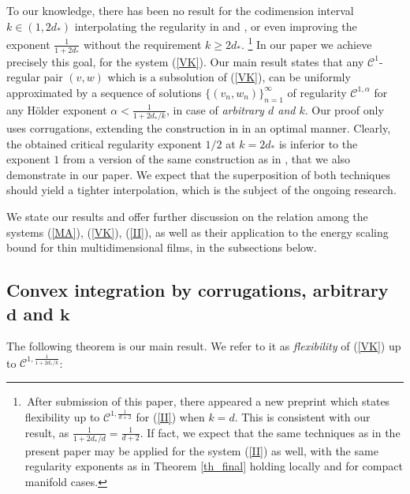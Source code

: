 \documentclass[reqno,twoside,11pt]{amsart}
\numberwithin{equation}{section}
\theoremstyle{plain}
\theoremstyle{definition}
\begin{document}
\noindent To our knowledge, there has been no result
for the codimension interval $k\in (1, 2d_*)$
interpolating the regularity in \cite{CDS} and \cite{Kallen}, 
or even improving the exponent $\frac{1}{1+2d_*}$ without the requirement $k\geq 2d_*$.
\footnote{ $\,$After submission of this paper, there appeared a new preprint \cite{CS_new} which
states flexibility up to $\mathcal{C}^{1,\frac{1}{d+2}}$ 
for (\ref{II}) when $k=d$. This is consistent with our
result, as $\frac{1}{1+2d_*/d} = \frac{1}{d+2}$. If fact, we
expect that the same techniques as in the present paper may be
applied for the system (\ref{II}) as well, with the same regularity
exponents as in Theorem \ref{th_final} holding locally and for compact
manifold cases.}
In our paper we achieve precisely this goal, for the
system (\ref{VK}). Our main result states that any $\mathcal{C}^1$-regular pair $(v,w)$ 
which is a subsolution of (\ref{VK}), can be uniformly approximated
by a sequence of solutions $\{(v_n,w_n)\}_{n=1}^\infty$ of regularity
$\mathcal{C}^{1,\alpha}$ for any H\"older exponent
$\alpha<\frac{1}{1+2d_*/k}$, in case of {\em arbitrary $d$ and $k$}. Our proof
only uses corrugations, extending the construction in \cite{CDS}
in an optimal manner. Clearly, the obtained critical regularity exponent $1/2$
at $k=2d_*$ is inferior to the exponent $1$ from a version of the same
construction as in \cite{Kallen}, that we also demonstrate in our
paper. We expect that the superposition of both techniques should
yield a tighter interpolation, which is the subject of the ongoing research.

\bigskip

\noindent We state our results and offer further discussion on the
relation among the systems (\ref{MA}), (\ref{VK}), (\ref{II}), as well
as their application to the energy scaling bound for thin
multidimensional films, in the subsections below.

\subsection{Convex integration by corrugations, arbitrary $\mathbf{d}$ and $\mathbf{k}$}
The following theorem is our main result.  We refer to it as {\em flexibility} of (\ref{VK}) up to
$\mathcal{C}^{1,\frac{1}{1+2d_*/k}}$:
\end{document}
